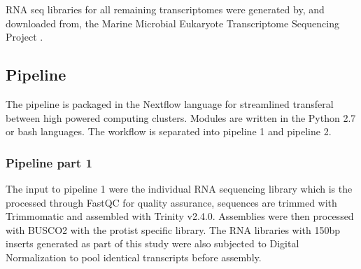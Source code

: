 \documentclass[12pt]{article}
\begin{document}
RNA seq libraries for all remaining transcriptomes were generated by, and downloaded from, the Marine Microbial Eukaryote Transcriptome Sequencing Project \citep{keeling2014marine}.

\subsection*{Pipeline}
The pipeline is packaged in the Nextflow language for streamlined transferal between high powered computing clusters. Modules are written in the Python 2.7 or bash languages. The workflow is separated into pipeline 1 and pipeline 2. 
\subsubsection*{Pipeline part 1}
The input to pipeline 1 were the individual RNA sequencing library which is the processed through FastQC for quality assurance, sequences are trimmed with Trimmomatic and assembled with Trinity v2.4.0. Assemblies were then processed with BUSCO2 with the protist specific library.
The RNA libraries with 150bp inserts generated as part of this study were also subjected to Digital Normalization to pool identical transcripts before assembly.                                                                                                                                                                                                                                                                                                                                                                                                                                                                                                                                                                                                                                                                                                                                                                                                                                                                                                                                                                                                                                                                                                                                                                                                                                                                                                                                           
\end{document}
